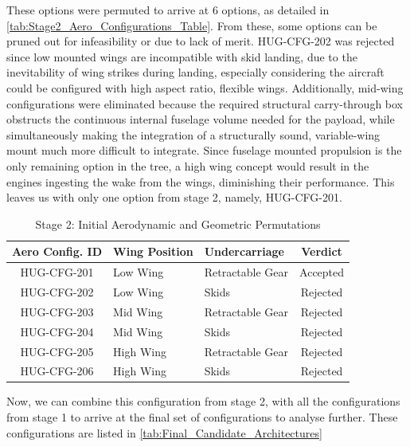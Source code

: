 These options were permuted to arrive at 6 options, as detailed in \autoref{tab:Stage2_Aero_Configurations_Table}. From these, some options can be pruned out for infeasibility or due to lack of merit. HUG-CFG-202 was rejected since low mounted wings are incompatible with skid landing, due to the inevitability of wing strikes during landing, especially considering the aircraft could be configured with high aspect ratio, flexible wings. Additionally, mid-wing configurations were eliminated because the required structural carry-through box obstructs the continuous internal fuselage volume needed for the payload, while simultaneously making the integration of a structurally sound, variable-wing mount much more difficult to integrate. Since fuselage mounted propulsion is the only remaining option in the tree, a high wing concept would result in the engines ingesting the wake from the wings, diminishing their performance. This leaves us with only one option from stage 2, namely, HUG-CFG-201.

\begin{table}[H]
    \centering
    \caption{Stage 2: Initial Aerodynamic and Geometric Permutations}
    \label{tab:Stage2_Aero_Configurations_Table}
    \renewcommand{\arraystretch}{1.3}
    \begin{tabular}{|c|p{4cm}|p{4cm}|c|}
        \hline
        \textbf{Aero Config. ID} & \textbf{Wing Position} & \textbf{Undercarriage} & \textbf{Verdict} \\
        \hline\hline
        HUG-CFG-201 & Low Wing & Retractable Gear & Accepted \\
        \hline
        HUG-CFG-202 & Low Wing & Skids & Rejected \\
        \hline
        HUG-CFG-203 & Mid Wing & Retractable Gear & Rejected \\
        \hline
        HUG-CFG-204 & Mid Wing & Skids & Rejected \\
        \hline
        HUG-CFG-205 & High Wing & Retractable Gear & Rejected \\
        \hline
        HUG-CFG-206 & High Wing & Skids & Rejected \\
        \hline
    \end{tabular}
\end{table}

Now, we can combine this configuration from stage 2, with all the configurations from stage 1 to arrive at the final set of configurations to analyse further. These configurations are listed in \autoref{tab:Final_Candidate_Architectures}

